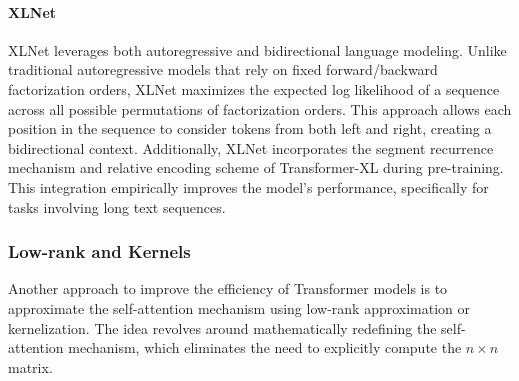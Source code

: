 \paragraph{XLNet}

XLNet \citep{yang2019xlnet} leverages both autoregressive and bidirectional language modeling. Unlike traditional autoregressive models that rely on fixed forward/backward factorization orders, XLNet maximizes the expected log likelihood of a sequence across all possible permutations of factorization orders. This approach allows each position in the sequence to consider tokens from both left and right, creating a bidirectional context. Additionally, XLNet incorporates the segment recurrence mechanism and relative encoding scheme of Transformer-XL during pre-training. This integration empirically improves the model's performance, specifically for tasks involving long text sequences.




\subsubsection{Low-rank and Kernels}

Another approach to improve the efficiency of Transformer models is to approximate the self-attention mechanism using low-rank approximation or kernelization. The idea revolves around mathematically redefining the self-attention mechanism, which eliminates the need to explicitly compute the $n \times n$ matrix.

